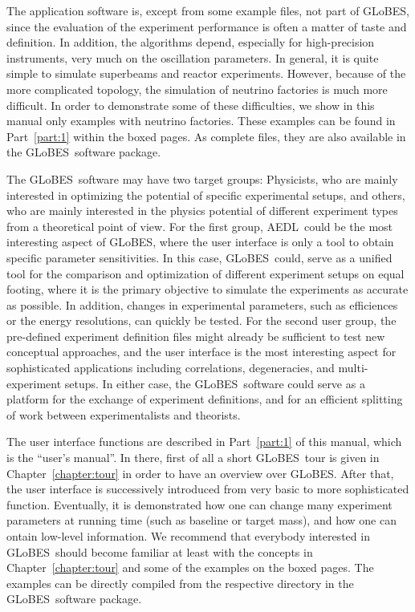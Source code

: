\documentclass[a4paper,12pt,twoside]{book}
\newcommand{\Chapt}{Chapter}
\newcommand{\Part}{Part}
\newcommand{\GLOBES}{{\sf GLoBES}}
\newcommand{\AEDL}{{\sf AEDL}}
\begin{document}
The application 
software is, except from some example files, not part of \GLOBES , since
the evaluation of the experiment performance is often a matter of taste
and definition. In addition, the algorithms depend, especially for
high-precision instruments, very much on the oscillation parameters.
In general, it is quite simple to simulate superbeams and reactor
experiments. However, because of the more complicated topology, the
simulation of neutrino factories is much more difficult. In order
to demonstrate some of these difficulties, we show in this manual only
examples with neutrino factories. These examples can be found in
\Part~\ref{part:1} within the boxed pages. As complete files, they
are also available in the \GLOBES\ software package.

The \GLOBES\ software may have two target groups: 
Physicists, who are mainly interested in optimizing the potential
of specific experimental setups, and others, who are mainly
interested in the physics potential of different experiment types
from a theoretical point of view.
For the first group, \AEDL\ could be the most interesting aspect of
\GLOBES , where the user interface is only a tool to obtain specific
parameter sensitivities. In this case, \GLOBES\ could, serve as a
unified tool for the comparison and optimization of different experiment
 setups on equal footing, where
it is the primary objective to simulate the experiments as accurate
as possible. In addition, changes in experimental parameters, such as
efficiences or the energy resolutions, can quickly be tested.
%
For the second user group, the pre-defined 
experiment definition files might already be sufficient to test
new conceptual approaches, and the user interface is the most interesting
aspect for sophisticated applications including correlations,
degeneracies, and multi-experiment setups. In either case, the \GLOBES\
software could serve as a platform for the exchange of experiment
definitions, and for an efficient splitting of work between
experimentalists and theorists.

The user interface functions are described in \Part~\ref{part:1} of 
this manual, which is the ``user's manual''. In there, first of all a 
short \GLOBES\ tour is given in \Chapt~\ref{chapter:tour} in order to 
have an overview over \GLOBES . 
After that, the user
interface is successively introduced from very basic to more sophisticated
function. Eventually, it is demonstrated how one can change many
experiment parameters at running time (such as baseline or target mass), and how one can ontain low-level
information. We recommend that everybody interested in \GLOBES\ should
become familiar at least with the concepts in \Chapt~\ref{chapter:tour}
 and some of the examples on the boxed pages. The examples can be 
 directly compiled 
 from the respective directory in the \GLOBES\ software package.
\end{document}
